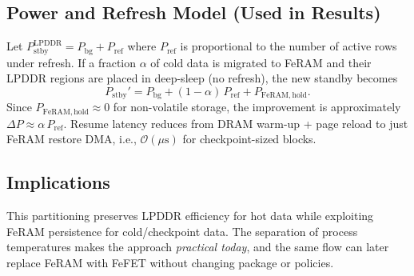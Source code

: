 \subsection{Power and Refresh Model (Used in Results)}
Let $P_{\mathrm{stby}}^{\mathrm{LPDDR}} = P_{\mathrm{bg}} + P_{\mathrm{ref}}$ where $P_{\mathrm{ref}}$ is proportional to the number of active rows under refresh. 
If a fraction $\alpha$ of cold data is migrated to FeRAM and their LPDDR regions are placed in deep-sleep (no refresh), the new standby becomes
\[
P_{\mathrm{stby}}' = P_{\mathrm{bg}} + (1-\alpha)\,P_{\mathrm{ref}} + P_{\mathrm{FeRAM,hold}}.
\]
Since $P_{\mathrm{FeRAM,hold}} \!\approx\! 0$ for non-volatile storage, the improvement is approximately $\Delta P \!\approx\! \alpha\,P_{\mathrm{ref}}$.
Resume latency reduces from DRAM warm-up + page reload to just FeRAM restore DMA, i.e., $\mathcal{O}(\mu\mathrm{s})$ for checkpoint-sized blocks.

\subsection{Implications}
This partitioning preserves LPDDR efficiency for hot data while exploiting FeRAM persistence for cold/checkpoint data. 
The separation of process temperatures makes the approach \emph{practical today}, and the same flow can later replace FeRAM with FeFET without changing package or policies.
